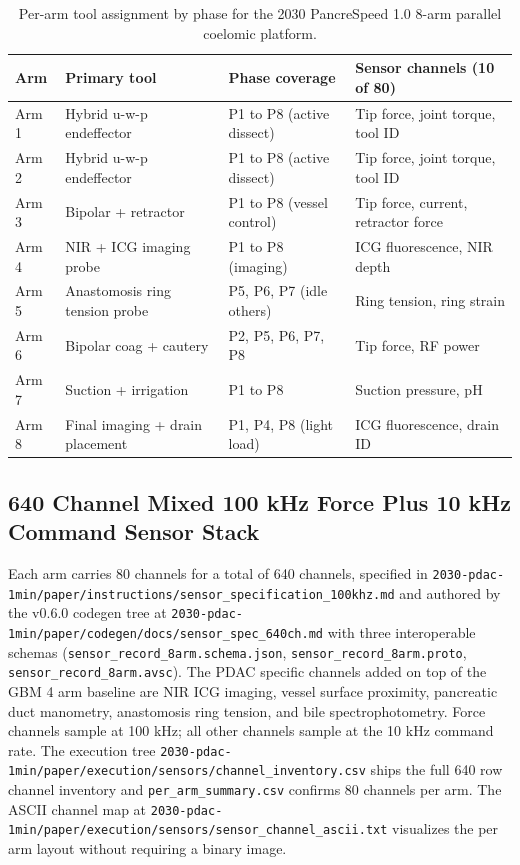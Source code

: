\begin{table}[H]
\caption{Per-arm tool assignment by phase for the 2030 PancreSpeed 1.0 8-arm parallel coelomic platform.}
\label{tab:methods-pancrespeed}
\centering
\begin{tabular}{>{\raggedright\arraybackslash}p{1.4cm} >{\raggedright\arraybackslash}p{4.0cm} >{\raggedright\arraybackslash}p{4.0cm} >{\raggedright\arraybackslash}p{4.0cm}}
\toprule
\textbf{Arm} & \textbf{Primary tool} & \textbf{Phase coverage} & \textbf{Sensor channels (10 of 80)} \\
\midrule
  Arm 1 & Hybrid u-w-p endeffector & P1 to P8 (active dissect) & Tip force, joint torque, tool ID \\
  Arm 2 & Hybrid u-w-p endeffector & P1 to P8 (active dissect) & Tip force, joint torque, tool ID \\
  Arm 3 & Bipolar + retractor & P1 to P8 (vessel control) & Tip force, current, retractor force \\
  Arm 4 & NIR + ICG imaging probe & P1 to P8 (imaging) & ICG fluorescence, NIR depth \\
  Arm 5 & Anastomosis ring tension probe & P5, P6, P7 (idle others) & Ring tension, ring strain \\
  Arm 6 & Bipolar coag + cautery & P2, P5, P6, P7, P8 & Tip force, RF power \\
  Arm 7 & Suction + irrigation & P1 to P8 & Suction pressure, pH \\
  Arm 8 & Final imaging + drain placement & P1, P4, P8 (light load) & ICG fluorescence, drain ID \\
\bottomrule
\end{tabular}
\end{table}

\subsection{640 Channel Mixed 100 kHz Force Plus 10 kHz Command Sensor Stack}
\label{sec:methods-sensors}

Each arm carries 80 channels for a total of 640 channels, specified
in
\texttt{2030-pdac-1min/paper/instructions/sensor_specification_100khz.md}
and authored by the v0.6.0 codegen tree at
\texttt{2030-pdac-1min/paper/codegen/docs/sensor_spec_640ch.md}
with three interoperable schemas
(\texttt{sensor_record_8arm.schema.json},
\texttt{sensor_record_8arm.proto},
\texttt{sensor_record_8arm.avsc}). The PDAC specific channels added
on top of the GBM 4 arm baseline are NIR ICG imaging, vessel
surface proximity, pancreatic duct manometry, anastomosis ring
tension, and bile spectrophotometry. Force channels sample at 100
kHz; all other channels sample at the 10 kHz command rate. The
execution tree
\texttt{2030-pdac-1min/paper/execution/sensors/channel_inventory.csv}
ships the full 640 row channel inventory and
\texttt{per_arm_summary.csv} confirms 80 channels per arm. The
ASCII channel map at
\texttt{2030-pdac-1min/paper/execution/sensors/sensor_channel_ascii.txt}
visualizes the per arm layout without requiring a binary image.


